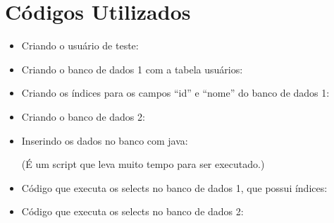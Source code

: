 \documentclass[12pt,a4paper]{article}
\begin{document}
\section{Códigos Utilizados}

\begin{itemize}
	\item Criando o usuário de teste:
		
	\item Criando o banco de dados 1 com a tabela usuários:	
		
	\item Criando os índices para os campos “id” e “nome” do banco de dados 1:	
		
	\item Criando o banco de dados 2:	
		
	\item Inserindo os dados no banco com java:	
		
	(É um script que leva muito tempo para ser executado.)
	\item Código que executa os selects no banco de dados 1, que possui índices:	
		
	\newpage
	\item Código que executa os selects no banco de dados 2:	
		
		
\end{itemize}

\newpage
\end{document}
